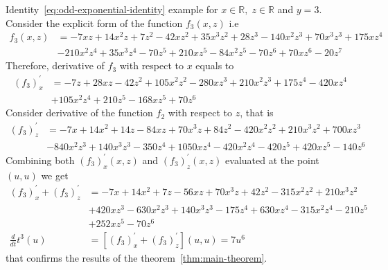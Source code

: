 \begin{example}
    \normalfont
    Identity~\eqref{eq:odd-exponential-identity} example for $x\in\mathbb{R}, \; z\in \mathbb{R}$ and $y=3$.
    Consider the explicit form of the function $f_{3} (x, z)$ i.e
    \begin{align*}
        f_3 (x, z) &= -7 x z + 14 x^2 z + 7 z^2 - 42 x z^2 + 35 x^3 z^2 + 28 z^3 -140 x^2 z^3 + 70 x^3 z^3 + 175 x z^4 \\
        &- 210 x^2 z^4 + 35 x^3 z^4 -70 z^5 + 210 x z^5 - 84 x^2 z^5 - 70 z^6 + 70 x z^6 - 20 z^7
    \end{align*}
    Therefore, derivative of $f_{3}$ with respect to $x$ equals to
    \begin{align*}
    (f_3)
        ^{'}_{x} &= -7 z + 28 x z - 42 z^2 + 105 x^2 z^2 - 280 x z^3 + 210 x^2 z^3 + 175 z^4 - 420 x z^4 \\
        &+ 105 x^2 z^4 + 210 z^5 - 168 x z^5 + 70 z^6
    \end{align*}
    Consider derivative of the function $f_2$ with respect to $z$, that is
    \begin{align*}
    (f_3)
        ^{'}_{z} &= -7 x + 14 x^2 + 14 z - 84 x z + 70 x^3 z + 84 z^2 - 420 x^2 z^2 + 210 x^3 z^2 + 700 x z^3 \\
        &- 840 x^2 z^3 + 140 x^3 z^3 - 350 z^4 + 1050 x z^4 - 420 x^2 z^4 - 420 z^5 + 420 x z^5 - 140 z^6
    \end{align*}
    Combining both $(f_3)^{'}_{x} (x, z)$ and $(f_3)^{'}_{z} (x, z)$ evaluated at the point $(u, u)$ we get
    \begin{align*}
    (f_3)
        ^{'}_{x} + (f_3)^{'}_{z} &= -7 x + 14 x^2 + 7 z - 56 x z + 70 x^3 z + 42 z^2 - 315 x^2 z^2 + 210 x^3 z^2 \\
        &+ 420 x z^3 - 630 x^2 z^3 + 140 x^3 z^3 - 175 z^4 + 630 x z^4 - 315 x^2 z^4 - 210 z^5 \\
        &+ 252 x z^5 - 70 z^6 \\
        \frac{d}{dt} t^{3} (u) &= [(f_3) ^{'}_{x} + (f_3)^{'}_{z}] (u,u) = 7 u^6
    \end{align*}
    that confirms the results of the theorem~\ref{thm:main-theorem}.
\end{example}